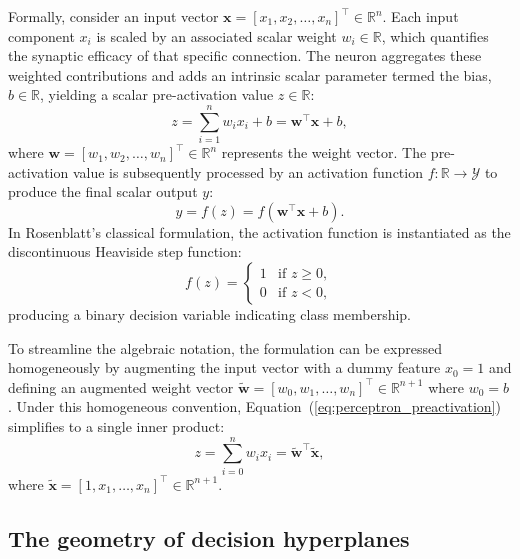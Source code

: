 \documentclass[../../../main.tex]{subfiles}
\begin{document}
Formally, consider an input vector $\mathbf{x} = [x_1, x_2, \dots, x_n]^\top \in \mathbb{R}^n$. Each input component $x_i$ is scaled by an associated scalar weight $w_i \in \mathbb{R}$, which quantifies the synaptic efficacy of that specific connection. The neuron aggregates these weighted contributions and adds an intrinsic scalar parameter termed the bias, $b \in \mathbb{R}$, yielding a scalar pre-activation value $z \in \mathbb{R}$:
\begin{equation}
z = \sum_{i=1}^n w_i x_i + b = \mathbf{w}^\top \mathbf{x} + b,
\label{eq:perceptron_preactivation}
\end{equation}
where $\mathbf{w} = [w_1, w_2, \dots, w_n]^\top \in \mathbb{R}^n$ represents the weight vector. The pre-activation value is subsequently processed by an activation function $f: \mathbb{R} \to \mathcal{Y}$ to produce the final scalar output $y$:
\begin{equation}
y = f(z) = f\left(\mathbf{w}^\top \mathbf{x} + b\right).
\label{eq:perceptron_output}
\end{equation}
In Rosenblatt's classical formulation, the activation function is instantiated as the discontinuous Heaviside step function:
\begin{equation}
f(z) = \begin{cases} 
1 & \text{if } z \ge 0, \\ 
0 & \text{if } z < 0,
\end{cases}
\end{equation}
producing a binary decision variable indicating class membership.

To streamline the algebraic notation, the formulation can be expressed homogeneously by augmenting the input vector with a dummy feature $x_0 = 1$ and defining an augmented weight vector $\tilde{\mathbf{w}} = [w_0, w_1, \dots, w_n]^\top \in \mathbb{R}^{n+1}$ where $w_0 = b$. Under this homogeneous convention, Equation~(\ref{eq:perceptron_preactivation}) simplifies to a single inner product:
\begin{equation}
z = \sum_{i=0}^n w_i x_i = \tilde{\mathbf{w}}^\top \tilde{\mathbf{x}},
\end{equation}
where $\tilde{\mathbf{x}} = [1, x_1, \dots, x_n]^\top \in \mathbb{R}^{n+1}$.

\subsection{The geometry of decision hyperplanes}
\label{subsec:hyperplane_geometry}
\end{document}
